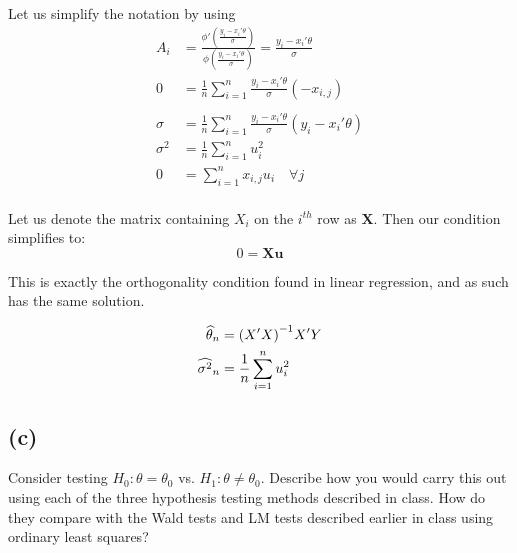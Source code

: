 \documentclass[12pt]{paper}
\begin{document}
Let us simplify the notation by using
\begin{align*}
  A_i &= \frac{\phi' \left( \frac{y_i
  - x_i' \theta}{\sigma} \right) }{\phi \left( \frac{y_i - x_i'\theta}{\sigma}
      \right)} = \frac{y_i - x_i' \theta}{\sigma}\\
  0 &= \frac{1}{n} \sum_{i=1}^n \frac{y_i - x_i' \theta}{\sigma} ( - x_{i,j})\\
  \\
  \sigma &= \frac{1}{n} \sum_{i=1}^n \frac{y_i - x_i' \theta}{\sigma} ( y_i - x_i' \theta)\\
  \sigma^2 &= \frac{1}{n} \sum_{i=1}^n u_i^2\\
  0 &= \sum_{i=1}^n  x_{i,j} u_i \quad \forall j\\
\end{align*}

Let us denote the matrix containing $X_i$ on the $i^{th}$ row as
$\bm{X}$. Then our condition simplifies to:
\begin{equation*}
    0 = \bm{X} \bm{u}
\end{equation*}

This is exactly the orthogonality condition found in linear
regression, and as such has the same solution.

\begin{align*}
  \widehat{ \theta }_{n} &= {(X' X)}^{-1} X'Y\\
  \widehat{ \sigma^2 }_{n} &= \frac{1}{n}\sum_{i=1}^n u_i^2
\end{align*}

\subsection{(c)}

Consider testing $H_0 : \theta = \theta_0$ vs. $H_1: \theta \neq \theta_0$. Describe how you
would carry this out using each of the three hypothesis testing
methods described in class. How do they compare with the Wald tests
and LM tests described earlier in class using ordinary least squares?\par
\end{document}
